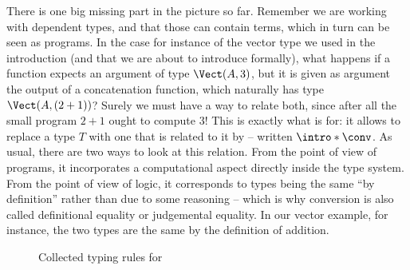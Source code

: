 \AP There is one big missing part in the picture so far. Remember we are working with
dependent types, and that those can contain terms, which in turn can be seen as programs.
In the case for instance of the vector type we used in the introduction (and that we are
about to introduce formally), what happens if a function expects an argument of type
$\Vect(A,3)$, but it is given as argument the output of a concatenation function,
which naturally has type $\Vect(A,(2+1))$?
Surely we must have a way to relate both, since after all
the small program $2+1$ ought to compute $3$! This is exactly what
%
is for: it allows to replace a type $T$ with one that is related to it by
 – written $\intro*\conv$.
As usual, there are two ways to look at this relation. From the point of view of programs,
it incorporates a computational aspect directly inside the type system.
From the point of view of logic, it corresponds to types being the same “by definition”
rather than due to some reasoning
– which is why conversion is also called definitional equality or judgemental equality.
In our vector example, for instance, the two types are the same by the definition of addition.

\begin{figure*}[ht]
  \LastFloat


  \caption{Collected typing rules for }
  \label{fig:ccw-typing}
\end{figure*}

